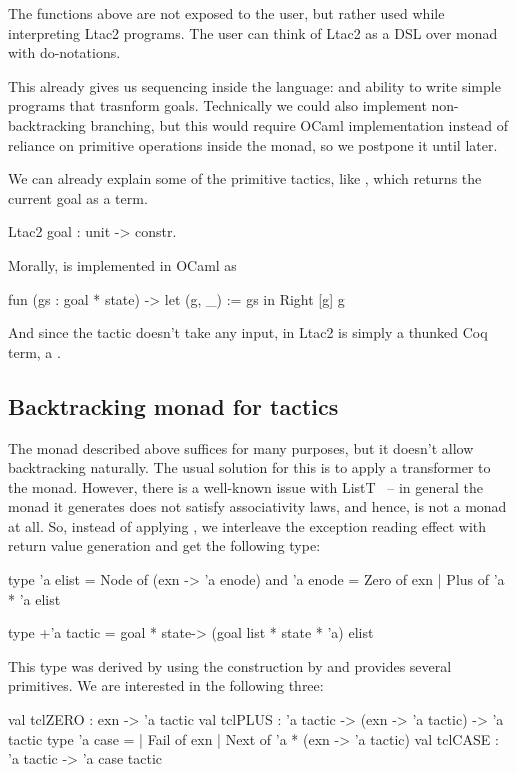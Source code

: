 The functions above are not exposed to the user, but rather used while interpreting Ltac2 programs.
The user can think of Ltac2 as a DSL over  monad with do-notations.

This already gives us sequencing inside the language:  and ability to write simple programs that trasnform goals.
Technically we could also implement non-backtracking branching, but this would require OCaml implementation instead of reliance on primitive operations inside the monad, so we postpone it until later.

We can already explain some of the primitive tactics, like , which returns the current goal as a term.
\begin{coq}
  Ltac2 goal : unit -> constr.
\end{coq}\vspace{-1em}
Morally,  is implemented in OCaml as
\begin{ocaml}
fun (gs : goal * state) -> let (g, _) := gs in Right [g] g
\end{ocaml}
And since the tactic doesn't take any input, in Ltac2  is simply a thunked Coq term, a .

\subsection{Backtracking monad for tactics}
\label{sec:backtr-monad-tact}

The monad described above suffices for many purposes, but it doesn't allow backtracking naturally.
The usual solution for this is to apply a  transformer to the monad.
However, there is a well-known issue with ListT~\cite{jones1993composing} -- in general the monad it generates does not satisfy associativity laws, and hence, is not a monad at all.
So, instead of applying , we interleave the exception reading effect with return value generation and get the following type:
\begin{ocaml}
type 'a elist = Node of (exn -> 'a enode)
and 'a enode = Zero of exn | Plus of 'a * 'a elist

type +'a tactic = goal * state-> (goal list * state * 'a) elist
\end{ocaml}
This type was derived by \citet{spiwackAbstractTypeConstructing2010} using the construction by \citet{kiselyovBacktrackingInterleavingTerminating2005} and provides several primitives.
We are interested in the following three:
\begin{ocaml}
val tclZERO : exn -> 'a tactic
val tclPLUS : 'a tactic -> (exn -> 'a tactic) -> 'a tactic
type 'a case =
  | Fail of exn
  | Next of 'a * (exn -> 'a tactic)
val tclCASE : 'a tactic -> 'a case tactic
\end{ocaml}

